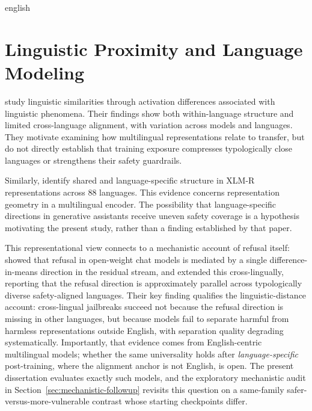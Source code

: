 \begin{otherlanguage*}{english}
\begin{landscape}
\end{landscape}

\newpage




	\section{Linguistic Proximity and Language Modeling}

\textcite{zhou-etal-2025-linguistic} study linguistic similarities through activation differences associated with linguistic phenomena. Their findings show both within-language structure and limited cross-language alignment, with variation across models and languages. They motivate examining how multilingual representations relate to transfer, but do not directly establish that training exposure compresses typologically close languages or strengthens their safety guardrails.
	
Similarly, \textcite{changGeometryMultilingualLanguage2022} identify shared and language-specific structure in XLM-R representations across 88 languages. This evidence concerns representation geometry in a multilingual encoder. The possibility that language-specific directions in generative assistants receive uneven safety coverage is a hypothesis motivating the present study, rather than a finding established by that paper.

This representational view connects to a mechanistic account of refusal itself: \textcite{arditiRefusalLanguageModels2024} showed that refusal in open-weight chat models is mediated by a single difference-in-means direction in the residual stream, and \textcite{wangRefusalDirectionUniversal2025} extended this cross-lingually, reporting that the refusal direction is approximately parallel across typologically diverse safety-aligned languages. Their key finding qualifies the linguistic-distance account: cross-lingual jailbreaks succeed not because the refusal direction is missing in other languages, but because models fail to separate harmful from harmless representations outside English, with separation quality degrading systematically. Importantly, that evidence comes from English-centric multilingual models; whether the same universality holds after \emph{language-specific} post-training, where the alignment anchor is not English, is open. The present dissertation evaluates exactly such models, and the exploratory mechanistic audit in Section~\ref{sec:mechanistic-followup} revisits this question on a same-family safer-versus-more-vulnerable contrast whose starting checkpoints differ.


\end{otherlanguage*}
